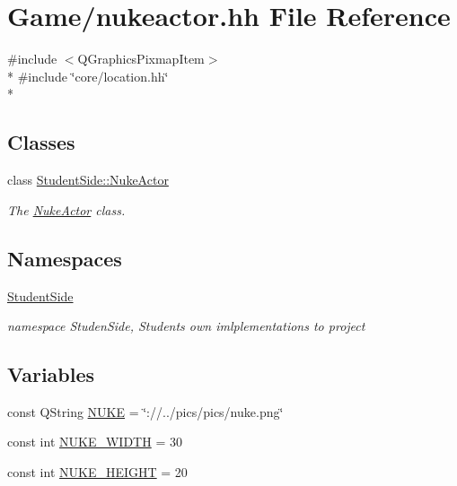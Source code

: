 \hypertarget{nukeactor_8hh}{\section{Game/nukeactor.hh File Reference}
\label{nukeactor_8hh}
}
{\ttfamily \#include $<$Q\-Graphics\-Pixmap\-Item$>$}\\*
{\ttfamily \#include \char`\"{}core/location.\-hh\char`\"{}}\\*
\subsection*{Classes}
\begin{DoxyCompactItemize}
\item 
class \hyperlink{class_student_side_1_1_nuke_actor}{Student\-Side\-::\-Nuke\-Actor}
\begin{DoxyCompactList}\small\item\em The \hyperlink{class_student_side_1_1_nuke_actor}{Nuke\-Actor} class. \end{DoxyCompactList}\end{DoxyCompactItemize}
\subsection*{Namespaces}
\begin{DoxyCompactItemize}
\item 
\hyperlink{namespace_student_side}{Student\-Side}
\begin{DoxyCompactList}\small\item\em namespace Studen\-Side, Students own imlplementations to project \end{DoxyCompactList}\end{DoxyCompactItemize}
\subsection*{Variables}
\begin{DoxyCompactItemize}
\item 
const Q\-String \hyperlink{nukeactor_8hh_a533b7f84d79dc6971f2d2b7db8c9206e}{N\-U\-K\-E} = \char`\"{}\-://../pics/pics/nuke.\-png\char`\"{}
\item 
const int \hyperlink{nukeactor_8hh_a86069c9a9259fea726afb281654acb9c}{N\-U\-K\-E\-\_\-\-W\-I\-D\-T\-H} = 30
\item 
const int \hyperlink{nukeactor_8hh_aa87a4f879db9b0096ae5c8b47973368c}{N\-U\-K\-E\-\_\-\-H\-E\-I\-G\-H\-T} = 20
\end{DoxyCompactItemize}



